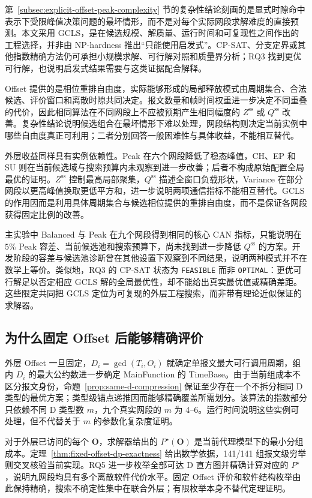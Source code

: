 \documentclass[UTF8,a4paper,twoside,zihao=-4]{ctexart}
\numberwithin{equation}{section}
\numberwithin{figure}{section}
\numberwithin{table}{section}
\theoremstyle{definition}
\numberwithin{algocf}{section}
\begin{document}
第~\ref{subsec:explicit-offset-peak-complexity} 节的复杂性结论刻画的是显式时隙命中表示下受限峰值决策问题的最坏情形，而不是对每个实际网段求解难度的直接预测。本文采用 GCLS，是在候选规模、解质量、运行时间和可复现性之间作出的工程选择，并非由 NP-hardness 推出“只能使用启发式”。CP-SAT、分支定界或其他指数精确方法仍可承担小规模求解、可行解对照和质量界分析；RQ3 找到更优可行解，也说明启发式结果需要与这类证据配合解释。

Offset 提供的是相位重排自由度，实际能够形成的局部释放模式由周期集合、合法候选、评价窗口和离散时隙共同决定。报文数量和帧时间权重进一步决定不同重叠的代价，因此相同算法在不同网段上不应被预期产生相同幅度的 $Z^{\mathrm{ss}}$ 或 $Q^{\mathrm{ss}}$ 改善。复杂性结论说明候选组合在最坏情形下难以处理，网段结构则决定当前实例中哪些自由度真正可利用；二者分别回答一般困难性与具体收益，不能相互替代。

外层收益同样具有实例依赖性。Peak 在六个网段降低了稳态峰值，CH、EP 和 SU 则在当前候选域与搜索预算内未观察到进一步改善；后者不构成原始配置全局最优的证明。$Z^{\mathrm{ss}}$ 控制最高局部聚集，$Q^{\mathrm{ss}}$ 描述全窗口负载形状，Variance 在部分网段以更高峰值换取更低平方和，进一步说明两项通信指标不能相互替代。GCLS 的作用因而是利用具体周期集合与候选相位提供的重排自由度，而不是保证各网段获得固定比例的改善。

主实验中 Balanced 与 Peak 在九个网段得到相同的核心 CAN 指标，只能说明在 $5\%$ Peak 容差、当前候选池和搜索预算下，尚未找到进一步降低 $Q^{\mathrm{ss}}$ 的方案。开发阶段的容差与候选池诊断曾在其他设置下观察到不同结果，说明两种模式并不在数学上等价。类似地，RQ3 的 CP-SAT 状态为 \texttt{FEASIBLE} 而非 \texttt{OPTIMAL}：更优可行解足以否定相应 GCLS 解的全局最优性，却不能给出真实最优值或精确差距。这些限定共同把 GCLS 定位为可复现的外层工程搜索，而非带有理论近似保证的求解器。

\subsection{为什么固定 Offset 后能够精确评价}
\label{subsec:discussion-exact-evaluation}

外层 Offset 一旦固定，$D_i=\gcd(T_i,O_i)$ 就确定单报文最大可行调用周期，组内 $D_i$ 的最大公约数进一步确定 MainFunction 的 TimeBase。由于当前组成本不区分报文身份，命题~\ref{prop:same-d-compression} 保证至少存在一个不拆分相同 D 类型的最优方案；类型级锚点递推因而能够精确覆盖所需划分。该算法的指数部分只依赖不同 D 类型数 $m$，九个真实网段的 $m$ 为 4--6。运行时间说明这些实例可处理，但不代替关于 $m$ 的参数化复杂度证明。

对于外层已访问的每个 $\boldsymbol O$，求解器给出的 $P^\star(\boldsymbol O)$ 是当前代理模型下的最小分组成本。定理~\ref{thm:fixed-offset-dp-exactness} 给出数学依据，141/141 组报文级穷举则交叉核验当前实现。RQ5 进一步枚举全部可达 D 直方图并精确计算对应的 $P^\star$，说明九网段均具有多个离散软件代价水平。固定 Offset 评价和软件结构枚举由此保持精确，搜索不确定性集中在联合外层；有限枚举本身不替代定理证明。
\end{document}
